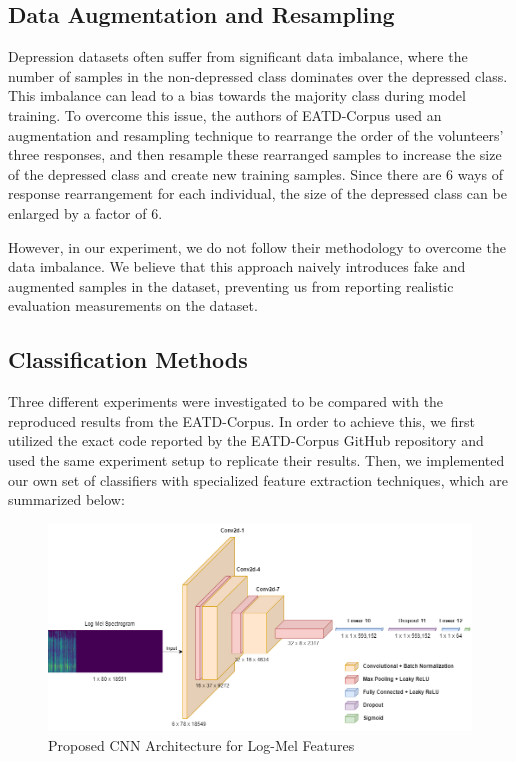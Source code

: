 \subsection{Data Augmentation and Resampling}

Depression datasets often suffer from significant data imbalance, where the number of samples in the non-depressed class dominates over the depressed class. This imbalance can lead to a bias towards the majority class during model training. To overcome this issue, the authors of EATD-Corpus used an augmentation and resampling technique to rearrange the order of the volunteers' three responses, and then resample these rearranged samples to increase the size of the depressed class and create new training samples. Since there are 6 ways of response rearrangement for each individual, the size of the depressed class can be enlarged by a factor of 6.

However, in our experiment, we do not follow their methodology to overcome the data imbalance. We believe that this approach naively introduces fake and augmented samples in the dataset, preventing us from reporting realistic evaluation measurements on the dataset.


\subsection{Classification Methods}

Three different experiments were investigated to be compared with the reproduced results from the EATD-Corpus. In order to achieve this, we first utilized the exact code reported by the EATD-Corpus GitHub repository \cite{shen2022icassp} and used the same experiment setup to replicate their results. Then, we implemented our own set of classifiers with specialized feature extraction techniques, which are summarized below:



\begin{figure}[!t]
    \centerline{\includegraphics[width=\columnwidth]{images/CNN.png}}
    \caption{Proposed CNN Architecture for Log-Mel Features}
    \label{fig:cnn}
\end{figure}

